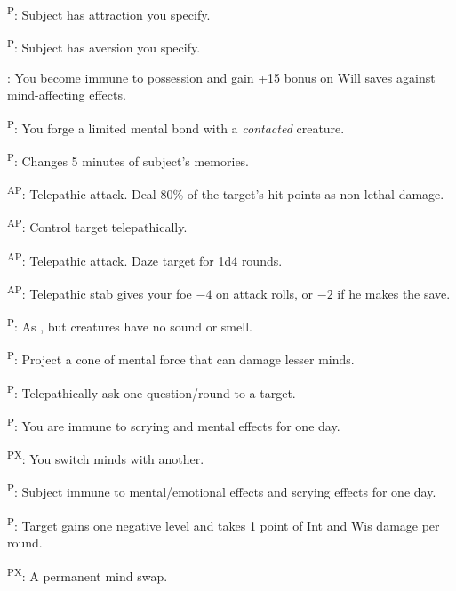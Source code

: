 \begin{enumerate*}
\item {}\textsuperscript{P}: Subject has attraction you specify.

      \textsuperscript{P}: Subject has aversion you specify.

      : You become immune to possession and gain +15 bonus on Will saves against mind-affecting effects.

      \textsuperscript{P}: You forge a limited mental bond with a \emph{contacted} creature.

      \textsuperscript{P}: Changes 5 minutes of subject's memories.

      \textsuperscript{AP}: Telepathic attack. Deal 80\% of the target's hit points as non-lethal damage.

\item {}\textsuperscript{AP}: Control target telepathically.

      \textsuperscript{AP}: Telepathic attack. Daze target for 1d4 rounds.

      \textsuperscript{AP}: Telepathic stab gives your foe $-4$ on attack rolls, or $-2$ if he makes the save.

      \textsuperscript{P}: As , but creatures have no sound or smell.

\item {}\textsuperscript{P}: Project a cone of mental force that can damage lesser minds.

      \textsuperscript{P}: Telepathically ask one question/round to a target.

\item {}\textsuperscript{P}: You are immune to scrying and mental effects for one day.

      \textsuperscript{PX}: You switch minds with another.

\item {}\textsuperscript{P}: Subject immune to mental/emotional effects and scrying effects for one day.

      \textsuperscript{P}: Target gains one negative level and takes 1 point of Int and Wis damage per round.

\item {}\textsuperscript{PX}: A permanent mind swap.
\end{enumerate*}
